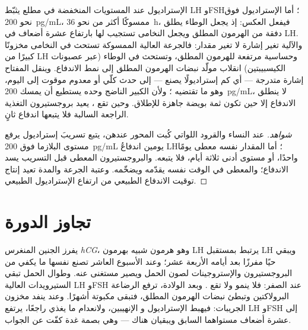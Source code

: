 \begin{theorem}\label{thm:b2:reproductive-hormones:switch}
الإستراديول عند المستويات المنخفضة في مطلع 
يثبّط LH وFSH؛ أما الإستراديول فوق نحو \qty{200}{pg/mL}، ممسوكًا
أكثر من نحو \qty{36}{h}، فيفعل العكس: إذ يجعل
الوطاء يطلق دفقة من الهرمون المطلق ويجعل النخامى تستجيب لها
بارتفاع عشرة أضعاف في LH. والآلية تغير إشارة لا
تغير مقدار: فالجرعة العالية الممسوكة تستحث في النخامى
مخزونًا كبيرًا من LH وحساسية مرتفعة للهرمون المطلق، وتستحث في
الوطاء (عبر عصبونات الكيسبيبتين) انقلاب مولّد نبضات
الهرمون المطلق إلى نمط الاندفاع. وينقل المفتاح إشارة
متدرجة --- أي كم إستراديولًا يصنع  --- إلى حدث
كلّي أو معدوم موقوت إلى اليوم، وهو ما تقتضيه
؛ ولأن  الكبير الناضج وحده يستطيع أن يمسك
\qty{200}{pg/mL}، لا ينطلق الاندفاع إلا حين تكون ثمة بويضة جاهزة
للإطلاق. وحين تقع ، يعيد بروجستيرون  التغذية الراجعة السالبة فلا يتبعها اندفاع ثانٍ.
\end{theorem}
\begin{proof}[شواهد]
عند النساء والقرود اللواتي كُبت المحور عندهن، يتبع تسريبَ
إستراديول يرفع مستوى البلازما فوق \qty{200}{pg/mL}
يومين اندفاعُ LH؛ أما المقدار نفسه معطى يومًا
واحدًا، أو مستوى أدنى ثلاثة أيام، فلا يتبعه. والبروجستيرون المعطى قبل
التسريب يسد الاندفاع؛ والمعطى في الوقت نفسه يقدّمه
ويضخّمه. وعتبة الجرعة والمدة تعيد إنتاج
توقيت الاندفاع الطبيعي من ارتفاع الإستراديول الطبيعي.
\end{proof}

\section{تجاوز الدورة}

\begin{proposition}\label{prop:b2:reproductive-hormones:overrides}
يفرز الجنين المنغرس \emph{hCG}، وهو هرمون شبيه بهرمون LH
يرتبط بمستقبل LH ويبقي  حيًا
مفرزًا بعد أيامه الأربعة عشر؛ وعند الأسبوع العاشر تصنع  نفسها
ما يكفي من البروجستيرون والإستروجينات لصون الحمل
ويصير  مستغنى عنه. وطوال الحمل تبقي الستيرويدات
العالية LH وFSH عند الصفر: فلا ينمو  ولا تقع .
وبعد الولادة، ترفع الرضاعة البرولاكتين وتبطئ نبضات الهرمون
المطلق، فتبقى  مكبوتة أشهرًا. وعند
\emph{} ينفد مخزون الجريبات: فيهبط الإستراديول و
الإنهيبين، ولانعدام ما يغذي راجعًا، يرتفع LH وFSH إلى عشرة
أضعاف مستواهما السابق ويبقيان هناك --- وهي بصمة
غدة كفّت عن الجواب.
\end{proposition}

